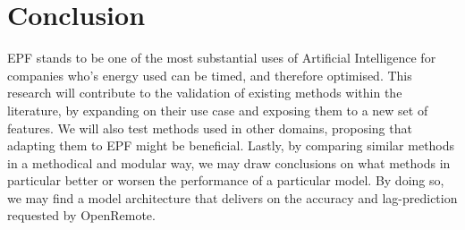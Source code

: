 \section{Conclusion}

EPF stands to be one of the most substantial uses of Artificial Intelligence for companies who's energy used can be timed, and therefore optimised.
This research will contribute to the validation of existing methods within the literature, by expanding on their use case and exposing them to a new set of features. We will also test methods used in other domains,
proposing that adapting them to EPF might be beneficial. Lastly, by comparing similar methods in a methodical and modular way, we may draw conclusions on what methods in particular better or worsen the performance of a particular model.
By doing so, we may find a model architecture that delivers on the accuracy and lag-prediction requested by OpenRemote.